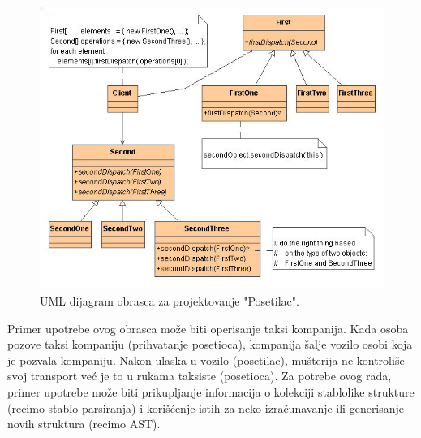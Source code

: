 \begin{figure}[h!]
    \centering
    \includegraphics[scale=0.6]{images/visitor.jpg}
    \caption{UML dijagram obrasca za projektovanje "Posetilac".} 
    \label{fig:UMLVisitor}
\end{figure}

Primer upotrebe ovog obrasca može biti operisanje taksi kompanija. Kada osoba pozove taksi kompaniju (prihvatanje posetioca), kompanija šalje vozilo osobi koja je pozvala kompaniju. Nakon ulaska u vozilo (posetilac), mušterija ne kontroliše svoj transport već je to u rukama taksiste (posetioca). Za potrebe ovog rada, primer upotrebe može biti prikupljanje informacija o kolekciji stablolike strukture (recimo stablo parsiranja) i korišćenje istih za neko izračunavanje ili generisanje novih struktura (recimo AST). 
